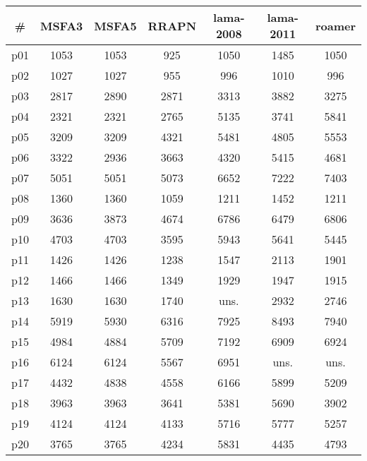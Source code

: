 \begin{tabular}{ccccccc}
\toprule
\textbf{\#} & \textbf{MSFA3} & \textbf{MSFA5} & \textbf{RRAPN} & \textbf{lama-2008} & \textbf{lama-2011} & \textbf{roamer}\\
\midrule
p01 & 1053 & 1053 & 925 & 1050 & 1485 & 1050\\
p02 & 1027 & 1027 & 955 & 996 & 1010 & 996\\
p03 & 2817 & 2890 & 2871 & 3313 & 3882 & 3275\\
p04 & 2321 & 2321 & 2765 & 5135 & 3741 & 5841\\
p05 & 3209 & 3209 & 4321 & 5481 & 4805 & 5553\\
p06 & 3322 & 2936 & 3663 & 4320 & 5415 & 4681\\
p07 & 5051 & 5051 & 5073 & 6652 & 7222 & 7403\\
p08 & 1360 & 1360 & 1059 & 1211 & 1452 & 1211\\
p09 & 3636 & 3873 & 4674 & 6786 & 6479 & 6806\\
p10 & 4703 & 4703 & 3595 & 5943 & 5641 & 5445\\
p11 & 1426 & 1426 & 1238 & 1547 & 2113 & 1901\\
p12 & 1466 & 1466 & 1349 & 1929 & 1947 & 1915\\
p13 & 1630 & 1630 & 1740 & uns. & 2932 & 2746\\
p14 & 5919 & 5930 & 6316 & 7925 & 8493 & 7940\\
p15 & 4984 & 4884 & 5709 & 7192 & 6909 & 6924\\
p16 & 6124 & 6124 & 5567 & 6951 & uns. & uns.\\
p17 & 4432 & 4838 & 4558 & 6166 & 5899 & 5209\\
p18 & 3963 & 3963 & 3641 & 5381 & 5690 & 3902\\
p19 & 4124 & 4124 & 4133 & 5716 & 5777 & 5257\\
p20 & 3765 & 3765 & 4234 & 5831 & 4435 & 4793\\
\bottomrule
\end{tabular}

